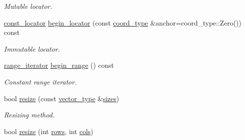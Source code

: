 \begin{DoxyCompactItemize}
\begin{DoxyCompactList}\small\item\em Mutable locator. \end{DoxyCompactList}\item 
\hypertarget{class_d_o_1_1_multi_array_a8a997b4130bfa21ad1213463ebadb4ae}{\hyperlink{class_d_o_1_1_multi_array_a4a50c3fdef274a291b3fc257677bea28}{const\-\_\-locator} \hyperlink{class_d_o_1_1_multi_array_a8a997b4130bfa21ad1213463ebadb4ae}{begin\-\_\-locator} (const \hyperlink{class_d_o_1_1_multi_array_ae4fb477425bbeb20329d300396ac2582}{coord\-\_\-type} \&anchor=coord\-\_\-type\-::\-Zero()) const }\label{class_d_o_1_1_multi_array_a8a997b4130bfa21ad1213463ebadb4ae}

\begin{DoxyCompactList}\small\item\em Immutable locator. \end{DoxyCompactList}\item 
\hypertarget{class_d_o_1_1_multi_array_a5b6444239bd00a52732b1ac4aeec929b}{\hyperlink{class_d_o_1_1_multi_array_a993ff1bd1b7d3a67eeea283b48b1b346}{range\-\_\-iterator} \hyperlink{class_d_o_1_1_multi_array_a5b6444239bd00a52732b1ac4aeec929b}{begin\-\_\-range} () const }\label{class_d_o_1_1_multi_array_a5b6444239bd00a52732b1ac4aeec929b}

\begin{DoxyCompactList}\small\item\em Constant range iterator. \end{DoxyCompactList}\item 
\hypertarget{class_d_o_1_1_multi_array_a3f049389446e1c60e25f09be5b64f192}{bool \hyperlink{class_d_o_1_1_multi_array_a3f049389446e1c60e25f09be5b64f192}{resize} (const \hyperlink{class_d_o_1_1_multi_array_aacf98e49e90f9aeead0ff8885fae3ac7}{vector\-\_\-type} \&\hyperlink{class_d_o_1_1_multi_array_a15f0ce2877b385c9505f042faa705694}{sizes})}\label{class_d_o_1_1_multi_array_a3f049389446e1c60e25f09be5b64f192}

\begin{DoxyCompactList}\small\item\em Resizing method. \end{DoxyCompactList}\item 
\hypertarget{class_d_o_1_1_multi_array_a574c89c5254dabd3d20950612732104a}{bool \hyperlink{class_d_o_1_1_multi_array_a574c89c5254dabd3d20950612732104a}{resize} (int \hyperlink{class_d_o_1_1_multi_array_a48cdd99e4e82f74c1adae2bd69970220}{rows}, int \hyperlink{class_d_o_1_1_multi_array_a3cefa469a7524d4bbc80531ebb9b5df4}{cols})}\label{class_d_o_1_1_multi_array_a574c89c5254dabd3d20950612732104a}


\end{DoxyCompactItemize}
